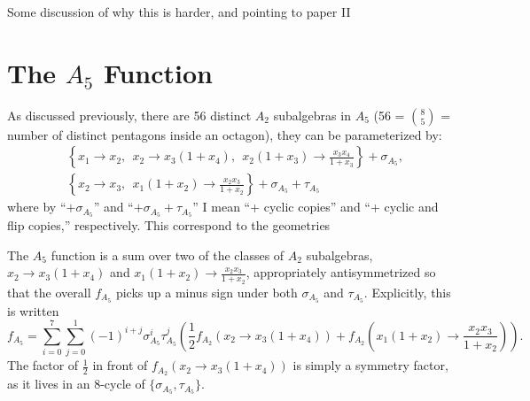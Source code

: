 \documentclass[11pt]{article}
\def\pdfeq#1{\texorpdfstring{$#1$}{a}}
\def\drawOctagon{
\coordinate (P1) at (45:1);
\coordinate (P2) at (90:1);
\coordinate (P3) at (135:1);
\coordinate (P4) at (180:1);
\coordinate (P5) at (225:1);
\coordinate (P6) at (270:1);
\coordinate (P7) at (315:1);
\coordinate (P8) at (359:1);
\draw (P1) -- (P2) -- (P3) -- (P4) -- (P5) -- (P6) -- (P7) -- (P8) -- cycle;
}
\begin{document}
Some discussion of why this is harder, and pointing to paper II

\section{The \pdfeq{A_5} Function} 

As discussed previously, there are 56 distinct $A_2$ subalgebras in $A_5$ (56 = $\genfrac(){0pt}{1}{8}{5}$ = number of distinct pentagons inside an octagon), they can be parameterized by:
\begin{equation}
\begin{split}
	&\left\{x_1\to x_2,~~
	x_2\to x_3\left(1+x_4\right),~~
	x_2\left(1+x_3\right)\to \frac{x_3 x_4}{1+x_3}\right\} + \sigma_{A_5},\\
	&\left\{x_2\to x_3,~~x_1 \left(1+x_2\right)\to \frac{x_2x_3}{1+x_2}\right\} + \sigma_{A_5} + \tau_{A_5} 
   \end{split}
\end{equation}
where by ``$+\sigma_{A_5}$'' and ``$+\sigma_{A_5}+\tau_{A_5}$'' I mean ``+ cyclic copies'' and ``+ cyclic and flip copies,'' respectively. This correspond to the geometries
\begin{center}
\end{center}

The $A_5$ function is a sum over two of the classes of $A_2$ subalgebras, $x_2\to x_3\left(1+x_4\right)$ and $x_1 \left(1+x_2\right)\to \frac{x_2x_3}{1+x_2}$, appropriately antisymmetrized so that the overall $f_{A_5}$ picks up a minus sign under both $\sigma_{A_5}$ and $\tau_{A_5}$. Explicitly, this is written
\begin{equation}
	f_{A_5} = \sum_{i=0}^7\sum_{j=0}^1(-1)^{i+j}\sigma_{A_5}^i\tau_{A_5}^j\left(\frac12 f_{A_2}\left(x_2\to x_3\left(1+x_4\right)\right) + f_{A_2}\left(x_1 \left(1+x_2\right)\to \frac{x_2x_3}{1+x_2}\right)\right).
\end{equation}
The factor of $\frac12$ in front of $f_{A_2}\left(x_2\to x_3\left(1+x_4\right)\right)$ is simply a symmetry factor, as it lives in an 8-cycle of $\{\sigma_{A_5},\tau_{A_5}\}$.
\end{document}
